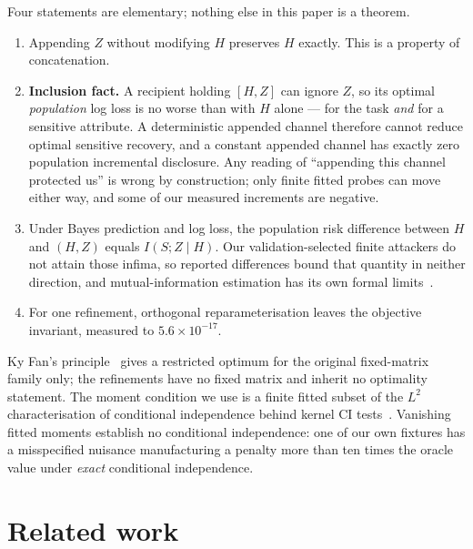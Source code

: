 \documentclass[conference]{IEEEtran}
\begin{document}
Four statements are elementary; nothing else in this paper is a theorem.

\begin{enumerate}\itemsep2pt
\item Appending $Z$ without modifying $H$ preserves $H$ exactly. This is a property of concatenation.
\item \textbf{Inclusion fact.} A recipient holding $[H,Z]$ can ignore $Z$, so its optimal \emph{population}
log loss is no worse than with $H$ alone --- for the task \emph{and} for a sensitive attribute. A
deterministic appended channel therefore cannot reduce optimal sensitive recovery, and a constant
appended channel has exactly zero population incremental disclosure. Any reading of ``appending this
channel protected us'' is wrong by construction; only finite fitted probes can move either way, and some
of our measured increments are negative.
\item Under Bayes prediction and log loss, the population risk difference between $H$ and $(H,Z)$ equals
$I(S;Z\mid H)$. Our validation-selected finite attackers do not attain those infima, so reported
differences bound that quantity in neither direction, and mutual-information estimation has its own
formal limits~\cite{mcallester2020formal}.
\item For one refinement, orthogonal reparameterisation leaves the objective invariant, measured to
$5.6\times10^{-17}$.
\end{enumerate}

Ky Fan's principle~\cite{fan1949weyl} gives a restricted optimum for the original fixed-matrix family
only; the refinements have no fixed matrix and inherit no optimality statement. The moment condition we
use is a finite fitted subset of the $L^2$ characterisation of conditional independence behind kernel CI
tests~\cite{zhang2011kci,strobl2019rcit}. Vanishing fitted moments establish no conditional independence:
one of our own fixtures has a misspecified nuisance manufacturing a penalty more than ten times the
oracle value under \emph{exact} conditional independence.

\section{Related work}
\label{sec:related}
\end{document}
